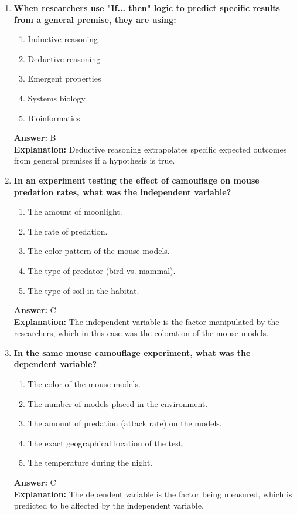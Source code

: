 \documentclass[11pt, a4paper]{article}
\begin{document}
\begin{enumerate}
\item \textbf{When researchers use "If... then" logic to predict specific results from a general premise, they are using:}
\begin{enumerate}[label=\Alph*.]
    \item Inductive reasoning
    \item Deductive reasoning
    \item Emergent properties
    \item Systems biology
    \item Bioinformatics
\end{enumerate}
\textbf{Answer:} B \\
\textbf{Explanation:} Deductive reasoning extrapolates specific expected outcomes from general premises if a hypothesis is true.

\item \textbf{In an experiment testing the effect of camouflage on mouse predation rates, what was the independent variable?}
\begin{enumerate}[label=\Alph*.]
    \item The amount of moonlight.
    \item The rate of predation.
    \item The color pattern of the mouse models.
    \item The type of predator (bird vs. mammal).
    \item The type of soil in the habitat.
\end{enumerate}
\textbf{Answer:} C \\
\textbf{Explanation:} The independent variable is the factor manipulated by the researchers, which in this case was the coloration of the mouse models.

\item \textbf{In the same mouse camouflage experiment, what was the dependent variable?}
\begin{enumerate}[label=\Alph*.]
    \item The color of the mouse models.
    \item The number of models placed in the environment.
    \item The amount of predation (attack rate) on the models.
    \item The exact geographical location of the test.
    \item The temperature during the night.
\end{enumerate}
\textbf{Answer:} C \\
\textbf{Explanation:} The dependent variable is the factor being measured, which is predicted to be affected by the independent variable.


\end{enumerate}
\end{document}
